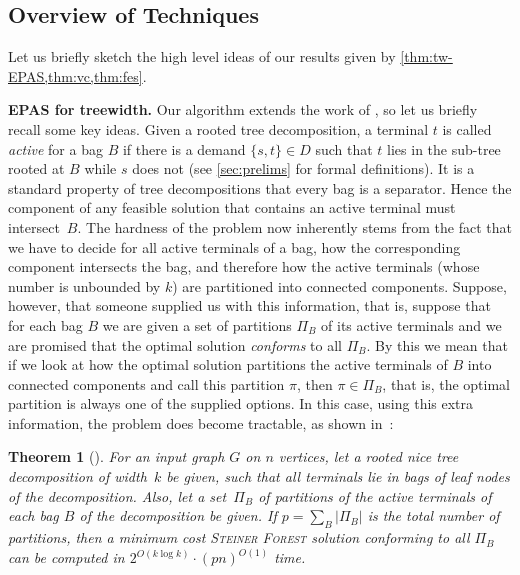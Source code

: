 \documentclass[a4paper]{article}
\let\oldcitet\citet
\renewcommand{\citet}[1]{\mbox{\oldcitet{#1}}}
\theoremstyle{plain}
\newtheorem{theorem}{Theorem}%
\newcommand{\pname}[1]{\textsc{#1}}
\newcommand{\SF}{\pname{Steiner Forest}\xspace}
\begin{document}
\subsection{Overview of Techniques}

%
%
%
%
Let us briefly sketch the high level ideas of our results given by \cref{thm:tw-EPAS,thm:vc,thm:fes}.

\smallskip
\textbf{EPAS for treewidth.} Our algorithm extends
the work of \cite{bateni2011approximation}, so let us briefly recall some key
ideas. 
Given a rooted tree decomposition, a terminal $t$ is called \emph{active} for a bag $B$
if there is a demand $\{s,t\}\in D$ such that $t$ lies in the sub-tree rooted at $B$
while $s$ does not (see \cref{sec:prelims} for formal definitions). 
It is a standard property of tree decompositions that every bag is a separator.
Hence the
component of any feasible solution that contains an active terminal must intersect~$B$. 
The hardness of the problem now inherently stems from the fact
that we have to decide for all active terminals of a bag, how
the corresponding component intersects the bag, and therefore how the active
terminals (whose number is unbounded by $k$) are partitioned into connected
components.  Suppose, however, that someone supplied us with this information,
that is, suppose that for each bag $B$ we are given a set of partitions $\Pi_B$
of its active terminals and we are promised that the optimal solution
\emph{conforms} to all $\Pi_B$. By this we mean that if we look at how the
optimal solution partitions the active terminals of $B$ into connected
components and call this partition $\pi$, then $\pi\in \Pi_B$, that is, the
optimal partition is always one of the supplied options. In this case, using
this extra information, the problem does become tractable, as shown in~\cite{bateni2011approximation}:

\begin{theorem}[\citet{bateni2011approximation}]\label{thm:tw-dp} For an input
graph $G$ on $n$ vertices, let a rooted nice tree decomposition of width~$k$ be
given, such that all terminals lie in bags of leaf nodes of the decomposition.
Also, let a set~$\Pi_B$ of partitions of the active terminals of each bag $B$ of
the decomposition be given. If $p=\sum_B |\Pi_B|$ is the total number of
partitions, then a minimum cost \SF solution conforming to all $\Pi_B$ can be
computed in $2^{O(k\log k)}\cdot(pn)^{O(1)}$ time.  
\end{theorem}
\end{document}
